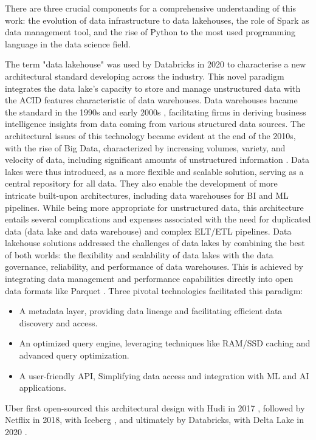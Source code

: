 There are three crucial components for a comprehensive understanding of this work: the evolution of data infrastructure to data lakehouses, the role of Spark as data management tool, and the rise of Python to the most used programming language in the data science field.

\smallskip

The term "data lakehouse" was used by Databricks in 2020 \cite{WhatLakehouse2020} to characterise a new architectural standard developing across the industry. This novel paradigm integrates the data lake's capacity to store and manage unstructured data with the \gls{ACID} features characteristic of data warehouses.
Data warehouses bacame the standard in the 1990s and early 2000s \cite{chaudhuriOverviewDataWarehousing1997}, facilitating firms in deriving business intelligence insights from data coming from various structured data sources. The architectural issues of this technology became evident at the end of the 2010s, with the rise of Big Data, characterized by increasing volumes, variety, and velocity of data, including significant amounts of unstructured information \cite{ederUnstructuredData802008}. 
Data lakes were thus introduced, as a more flexible and scalable solution, serving as a central repository for all data. They also enable the development of more intricate built-upon architectures, including data warehouses for \gls{BI} and \gls{ML} pipelines. While being more appropriate for unstructured data, this architecture entails several complications and expenses associated with the need for duplicated data (data lake and data warehouse) and complex \gls{ELT}/\gls{ETL} pipelines.
Data lakehouse solutions addressed the challenges of data lakes  by combining the best of both worlds: the flexibility and scalability of data lakes with the data governance, reliability, and performance of data warehouses. This is achieved by integrating data management and performance capabilities directly into open data formats like Parquet \cite{DremelMadeSimple}. Three pivotal technologies facilitated this paradigm:
\begin{itemize}
    \item A metadata layer, providing data lineage and facilitating efficient data discovery and access.
    \item An optimized query engine, leveraging techniques like \gls{RAM}/\gls{SSD} caching and advanced query optimization.
    \item A user-friendly API, Simplifying data access and integration with \gls{ML} and \gls{AI} applications.
\end{itemize}
Uber first open-sourced this architectural design with Hudi in 2017 \cite{rajaperumalUberEngineeringIncremental2017}, followed by Netflix in 2018, with Iceberg \cite{IcebergExamples2024}, and ultimately by Databricks, with Delta Lake in 2020 \cite{armbrustDeltaLakeHighperformance2020}.

